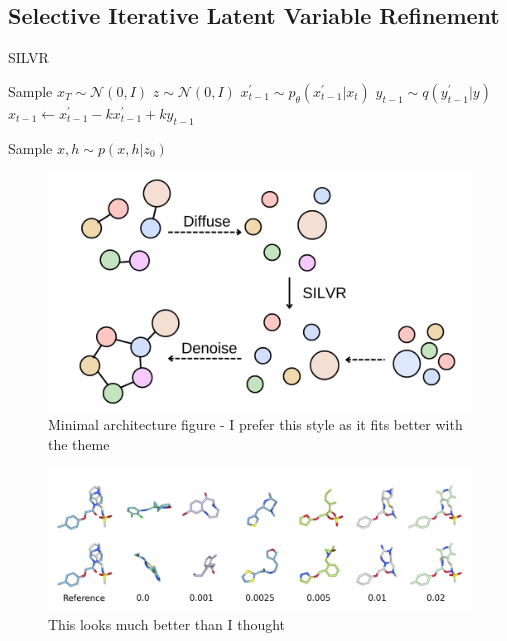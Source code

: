 \documentclass[journal=jacsat,manuscript=article]{achemso}
\begin{document}
\subsection{Selective Iterative Latent Variable Refinement}

\begin{algorithm}
\caption{SILVR}\label{alg:cap}
\begin{algorithmic}
\State Sample $x_T \sim \mathcal{N}(0,I)$
    \State $z \sim \mathcal{N}(0,I)$
    \State $x_{t-1}^\prime \sim p_\theta(x_{t-1}^\prime|x_t)$
    \State $y_{t-1} \sim q(y_{t-1}^\prime|y)$
    \State $x_{t-1} \gets x_{t-1}^\prime - k x_{t-1}^\prime +k y_{t-1}$ 

\EndFor
\State Sample $x,h \sim p(x,h|z_0)$ 
\end{algorithmic}
\end{algorithm}


\begin{figure}
    \centering
    \includegraphics[width=\textwidth]{Figures/minimal_model.png}
    \caption{Minimal architecture figure - I prefer this style as it fits better with the theme}
    \label{fig:fig_1}
\end{figure}


\begin{figure}
    \centering
    \includegraphics[width=\textwidth]{Figures/molecules_silvr_rates_horizontal.png}
    \caption{This looks much better than I thought}
    \label{fig:fig_2}
\end{figure}
\end{document}
